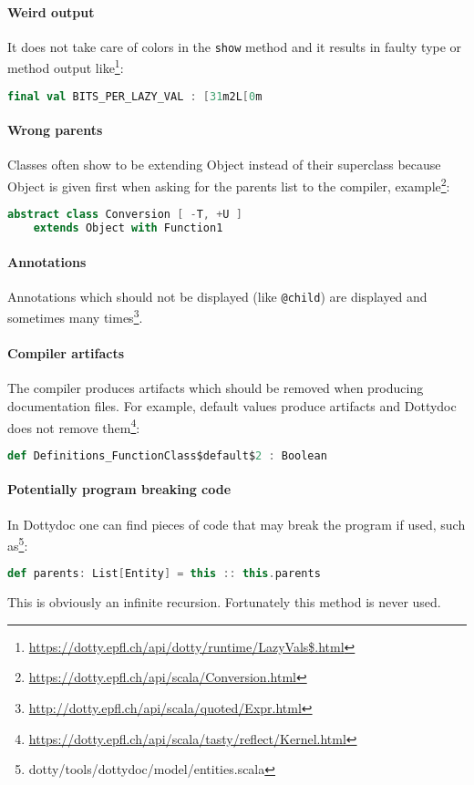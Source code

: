 \documentclass{report}
\begin{document}
\paragraph{Weird output}
It does not take care of colors in the \texttt{show} method and it results in faulty type or method output like\footnote{\url{https://dotty.epfl.ch/api/dotty/runtime/LazyVals$.html}}:
\begin{lstlisting}[language=scala]
    final val BITS_PER_LAZY_VAL : [31m2L[0m
\end{lstlisting}

\paragraph{Wrong parents}
Classes often show to be extending Object instead of their superclass because Object is given first when asking for the parents list to the compiler, example\footnote{\url{https://dotty.epfl.ch/api/scala/Conversion.html}}:
\begin{lstlisting}[language=scala]
    abstract class Conversion [ -T, +U ]
    extends Object with Function1
\end{lstlisting}

\paragraph{Annotations}
Annotations which should not be displayed (like \texttt{@child}) are displayed and sometimes many times\footnote{\url{http://dotty.epfl.ch/api/scala/quoted/Expr.html}}.

\paragraph{Compiler artifacts}
The compiler produces artifacts which should be removed when producing documentation files. For example, default values produce artifacts and Dottydoc does not remove them\footnote{\url{https://dotty.epfl.ch/api/scala/tasty/reflect/Kernel.html}}:
\begin{lstlisting}[language=scala]
    def Definitions_FunctionClass$default$2 : Boolean
\end{lstlisting}

\paragraph{Potentially program breaking code}
In Dottydoc one can find pieces of code that may break the program if used, such as\footnote{dotty/tools/dottydoc/model/entities.scala}:
\begin{lstlisting}[language=scala]
    def parents: List[Entity] = this :: this.parents
\end{lstlisting}
This is obviously an infinite recursion. Fortunately this method is never used.
\end{document}
